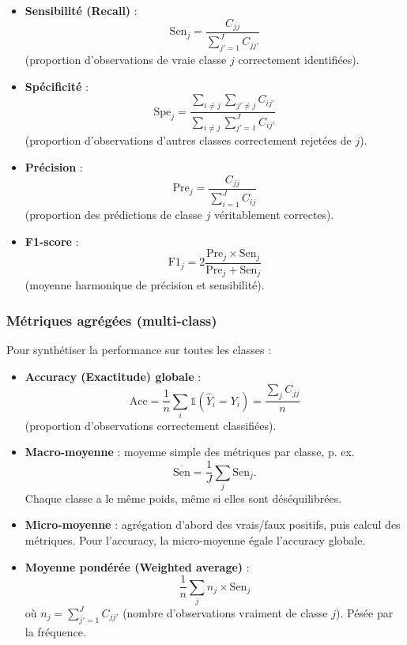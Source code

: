\documentclass[12pt,a4paper]{article}
\begin{document}
\begin{itemize}
    \item \textbf{Sensibilité (Recall)} : 
    $$\text{Sen}_j = \frac{C_{jj}}{\sum_{j'=1}^J C_{jj'}}$$ 
    (proportion d'observations de vraie classe $j$ correctement identifiées).
    
    \item \textbf{Spécificité} : 
    $$\text{Spe}_j = \frac{\sum_{i \neq j} \sum_{j' \neq j} C_{ij'}}{\sum_{i \neq j} \sum_{j'=1}^J C_{ij'}}$$ 
    (proportion d'observations d'autres classes correctement rejetées de $j$).
    
    \item \textbf{Précision} : 
    $$\text{Pre}_j = \frac{C_{jj}}{\sum_{i=1}^J C_{ij}}$$ 
    (proportion des prédictions de classe $j$ véritablement correctes).
    
    \item \textbf{F1-score} : 
    $$\text{F1}_j = 2 \frac{\text{Pre}_j \times \text{Sen}_j}{\text{Pre}_j + \text{Sen}_j}$$ 
    (moyenne harmonique de précision et sensibilité).
\end{itemize}

\subsubsection{Métriques agrégées (multi-class)}

Pour synthétiser la performance sur toutes les classes :

\begin{itemize}
    \item \textbf{Accuracy (Exactitude) globale} : 
    $$\text{Acc} = \frac{1}{n} \sum_i \mathbb{1}(\widehat{Y}_i = Y_i) = \frac{\sum_j C_{jj}}{n}$$ 
    (proportion d'observations correctement classifiées).
    
    \item \textbf{Macro-moyenne} : moyenne simple des métriques par classe, p. ex.
    $$\overline{\text{Sen}} = \frac{1}{J} \sum_j \text{Sen}_j.$$ 
    Chaque classe a le même poids, même si elles sont déséquilibrées.
    
    \item \textbf{Micro-moyenne} : agrégation d'abord des vrais/faux positifs, puis calcul des métriques. Pour l'accuracy, la micro-moyenne égale l'accuracy globale.
    
    \item \textbf{Moyenne pondérée (Weighted average)} : 
    $$\frac{1}{n} \sum_j n_j \times \text{Sen}_j$$ 
    où $n_j = \sum_{j'=1}^J C_{jj'}$ (nombre d'observations vraiment de classe $j$). Pésée par la fréquence.
\end{itemize}
\end{document}
